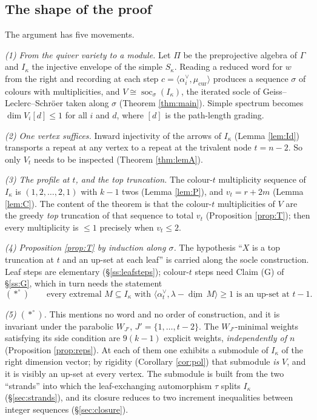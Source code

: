 \documentclass[reqno]{amsart}
\theoremstyle{plain}
\theoremstyle{definition}
\DeclareMathOperator{\soc}{soc}
\newcommand{\dimv}{\underline{\dim}\,}
\newcommand{\la}{\lambda}
\newcommand{\al}{\alpha}
\newcommand{\ka}{\kappa}
\newcommand{\Pia}{\Pi}
\begin{document}
\subsection{The shape of the proof}
The argument has five movements.

\smallskip\noindent
\emph{(1) From the quiver variety to a module.}  Let $\Pia$ be the
preprojective algebra of $\Gamma$ and $I_\ka$ the injective envelope of the
simple $S_\ka$.  Reading a reduced word for $w$ from the right and recording at
each step $c=\langle\al_i^\vee,\mu_{\mathrm{cur}}\rangle$ produces a sequence
$\sigma$ of colours with multiplicities, and $V\cong\soc_\sigma(I_\ka)$, the
iterated socle of Geiss--Leclerc--Schr\"oer taken along $\sigma$
(Theorem \ref{thm:main}).  Simple spectrum becomes
$\dim V_i[d]\le1$ for all $i$ and $d$, where $[d]$ is the path-length grading.

\smallskip\noindent
\emph{(2) One vertex suffices.}  Inward injectivity of the arrows of $I_\ka$
(Lemma \ref{lem:Id}) transports a repeat at any vertex to a repeat at the
trivalent node $t=n-2$.  So only $V_t$ needs to be inspected
(Theorem \ref{thm:lemA}).

\smallskip\noindent
\emph{(3) The profile at $t$, and the top truncation.}  The colour-$t$
multiplicity sequence of $I_\ka$ is $(1,2,\dots,2,1)$ with $k-1$ twos
(Lemma \ref{lem:P}), and $v_t=r+2m$ (Lemma \ref{lem:C}).  The content of the
theorem is that the colour-$t$ multiplicities of $V$ are the greedy \emph{top}
truncation of that sequence to total $v_t$ (Proposition \ref{prop:T}); then
every multiplicity is $\le1$ precisely when $v_t\le2$.

\smallskip\noindent
\emph{(4) Proposition \ref{prop:T} by induction along $\sigma$.}  The
hypothesis ``$X$ is a top truncation at $t$ and an up-set at each leaf'' is
carried along the socle construction.  Leaf steps are elementary
(\S\ref{ss:leafsteps}); colour-$t$ steps need Claim (G) of
\S\ref{ss:G}, which in turn needs the statement
\[
   (*^\circ)\qquad
   \text{every extremal } M\subseteq I_\ka \text{ with }
   \langle\al_t^\vee,\la-\dimv M\rangle\ge1 \text{ is an up-set at } t-1 .
\]

\smallskip\noindent
\emph{(5) $(*^\circ)$.}  This mentions no word and no order of construction,
and it is invariant under the parabolic $W_{J'}$, $J'=\{1,\dots,t-2\}$.  The
$W_{J'}$-minimal weights satisfying its side condition are $9(k-1)$ explicit
weights, \emph{independently of $n$} (Proposition \ref{prop:reps}).  At each of
them one exhibits a submodule of $I_\ka$ of the right dimension vector; by
rigidity (Corollary \ref{cor:pol}) that submodule \emph{is} $V$, and it is
visibly an up-set at every vertex.  The submodule is built from the two
``strands'' into which the leaf-exchanging automorphism $\tau$ splits $I_\ka$
(\S\ref{sec:strands}), and its closure reduces to two increment inequalities
between integer sequences (\S\ref{sec:closure}).
\end{document}
